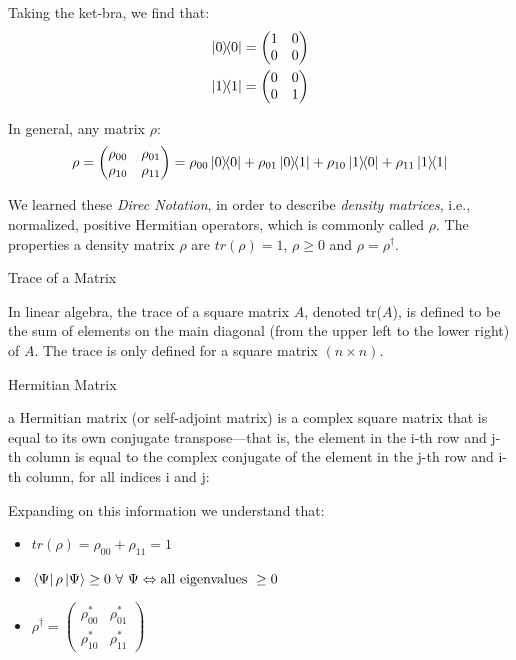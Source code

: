 Taking the ket-bra, we find that:
\begin{align*}
    \ketbra{0}{0} &=  \begin{pmatrix} 1 & 0 \\ 0 & 0\end{pmatrix}\\
    \ketbra{1}{1} &=  \begin{pmatrix} 0 & 0 \\ 0 & 1\end{pmatrix}
\end{align*}

In general, any matrix $\rho$:
\begin{equation*}
    \rho = \begin{pmatrix}
    \rho_{00} & \rho_{01}\\
    \rho_{10} & \rho_{11}
    \end{pmatrix} = \rho_{00} \ketbra{0}{0} + \rho_{01} \ketbra{0}{1} + \rho_{10} \ketbra{1}{0} + \rho_{11} \ketbra{1}{1} 
\end{equation*}

We learned these \textit{Direc Notation}, in order to describe \textit{density matrices}, i.e., normalized, positive Hermitian operators, which is commonly called $\rho$. The properties a density matrix $\rho$ are $tr(\rho) = 1$,  $\rho \geq 0$ and $\rho = \rho^\dagger$.

\begin{mdframed}[hidealllines=true,backgroundcolor=black!60, fontcolor = white]
\begin{center} Trace of a Matrix \end{center}
In linear algebra, the trace of a square matrix $A$, denoted tr($A$), is defined to be the sum of elements on the main diagonal (from the upper left to the lower right) of $A$. The trace is only defined for a square matrix $(n \times n)$. 
\end{mdframed}
\begin{mdframed}[hidealllines=true,backgroundcolor=black!60, fontcolor = white]
\begin{center} Hermitian Matrix \end{center}
a Hermitian matrix (or self-adjoint matrix) is a complex square matrix that is equal to its own conjugate transpose—that is, the element in the i-th row and j-th column is equal to the complex conjugate of the element in the j-th row and i-th column, for all indices i and j: 
\end{mdframed}

Expanding on this information we understand that:
\begin{itemize}
    \item $tr(\rho) = \rho_{00} + \rho_{11} = 1$
    \item $\bra{\Psi}\rho\ket{\Psi} \geq  0 \ \forall \ \Psi \Leftrightarrow \text{all eigenvalues } \geq 0$
    \item $\rho^\dagger = \begin{pmatrix} 
    \rho^*_{00} & \rho^*_{01}\\
    \rho^*_{10} & \rho^*_{11}
    \end{pmatrix}$
\end{itemize}

